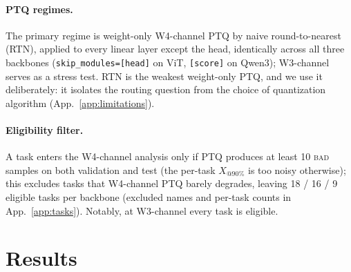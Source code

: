 \documentclass{article}
\makeatletter
\newcommand{\ptq}{\textsc{PTQ}\xspace}
\newcommand{\bad}{\textsc{bad}\xspace}
\newcommand{\xat}[1]{\ensuremath{X_{@#1\%}}}
\makeatother
\begin{document}
\paragraph{\ptq{} regimes.}
The primary regime is weight-only W4-channel \ptq{} by naive round-to-nearest (RTN), applied to every linear layer except the head, identically across all three backbones (\texttt{skip\_modules=[head]} on ViT, \texttt{[score]} on Qwen3); W3-channel serves as a stress test. RTN is the weakest weight-only \ptq{}, and we use it deliberately: it isolates the routing question from the choice of quantization algorithm (App.~\ref{app:limitations}).

\paragraph{Eligibility filter.}
A task enters the W4-channel analysis only if \ptq{} produces at least 10 \bad{} samples on both validation and test (the per-task \xat{90} is too noisy otherwise); this excludes tasks that W4-channel \ptq{} barely degrades, leaving 18 / 16 / 9 eligible tasks per backbone (excluded names and per-task counts in App.~\ref{app:tasks}). Notably, at W3-channel every task is eligible.

\section{Results}
\label{sec:headline}
\end{document}

